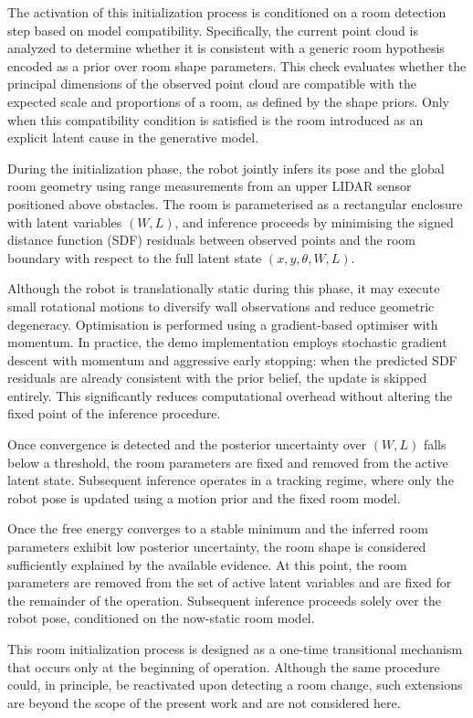 \documentclass[a4paper, twoside]{article}
\begin{document}
The activation of this initialization process is conditioned on a room detection step based on model compatibility. Specifically, the current point cloud is analyzed to determine whether it is consistent with a generic room hypothesis encoded as a prior over room shape parameters. This check evaluates whether the principal dimensions of the observed point cloud are compatible with the expected scale and proportions of a room, as defined by the shape priors. Only when this compatibility condition is satisfied is the room introduced as an explicit latent cause in the generative model.


During the initialization phase, the robot jointly infers its pose and the global room geometry using range measurements from an upper LIDAR sensor positioned above obstacles. The room is parameterised as a rectangular enclosure with latent variables $(W, L)$, and inference proceeds by minimising the signed distance function (SDF) residuals between observed points and the room boundary with respect to the full latent state $(x, y, \theta, W, L)$.

Although the robot is translationally static during this phase, it may execute small rotational motions to diversify wall observations and reduce geometric degeneracy.
Optimisation is performed using a gradient-based optimiser with momentum. In practice, the demo implementation employs stochastic gradient descent with momentum and aggressive early stopping: when the predicted SDF residuals are already consistent with the prior belief, the update is skipped entirely. This significantly reduces computational overhead without altering the fixed point of the inference procedure.

Once convergence is detected and the posterior uncertainty over $(W, L)$ falls below a threshold, the room parameters are fixed and removed from the active latent state. Subsequent inference operates in a tracking regime, where only the robot pose is updated using a motion prior and the fixed room model.


Once the free energy converges to a stable minimum and the inferred room parameters exhibit low posterior uncertainty, the room shape is considered sufficiently explained by the available evidence. At this point, the room parameters are removed from the set of active latent variables and are fixed for the remainder of the operation. Subsequent inference proceeds solely over the robot pose, conditioned on the now-static room model.

This room initialization process is designed as a one-time transitional mechanism that occurs only at the beginning of operation. Although the same procedure could, in principle, be reactivated upon detecting a room change, such extensions are beyond the scope of the present work and are not considered here.
\end{document}

